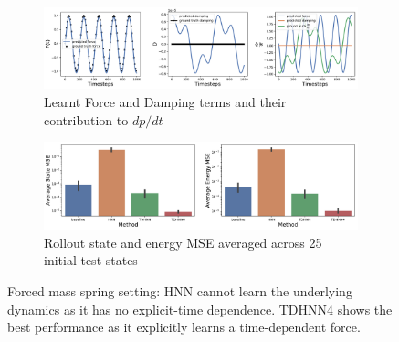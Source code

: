 \documentclass[twoside]{article}
\begin{document}
\begin{figure}[h!]
\begin{subfigure}[b]{0.48\textwidth}
		\centering
		\includegraphics[width=\textwidth]{figures/dpdt_forced_mass_spring_1.pdf}
		\caption{Learnt Force and Damping terms and their contribution to $dp/dt$}
	\end{subfigure}
	\begin{subfigure}[b]{0.48\textwidth}
	    \centering
		\includegraphics[width=\textwidth]{figures/mass_spring_forced_1_errors.pdf}
		\caption{Rollout state and energy MSE averaged across 25 initial test states}
	\end{subfigure}
\caption{Forced mass spring setting: HNN cannot learn the underlying dynamics as it has no explicit-time dependence. TDHNN4 shows the best performance as it explicitly learns a time-dependent force.}
\label{fig.fmspring1}
\end{figure}
\end{document}
